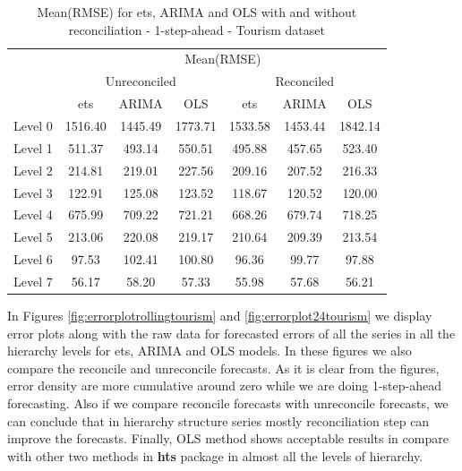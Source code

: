 \documentclass[11pt,a4paper,]{article}
\begin{document}
\begin{table}[t]

\caption{\label{tab:Tourismdataresulrolling}Mean(RMSE) for ets, ARIMA and OLS with and without reconciliation - 1-step-ahead - Tourism dataset}
\centering
\begin{tabular}{ccccccc}
\toprule
\multicolumn{1}{c}{} & \multicolumn{6}{c}{Mean(RMSE)} \\
\cmidrule(l{2pt}r{2pt}){2-7}
\multicolumn{1}{c}{} & \multicolumn{3}{c}{Unreconciled} & \multicolumn{3}{c}{Reconciled} \\
\cmidrule(l{2pt}r{2pt}){2-4} \cmidrule(l{2pt}r{2pt}){5-7}
 & ets & ARIMA & OLS & ets & ARIMA & OLS\\
\midrule
Level 0 & 1516.40 & 1445.49 & 1773.71 & 1533.58 & 1453.44 & 1842.14\\
Level 1 & 511.37 & 493.14 & 550.51 & 495.88 & 457.65 & 523.40\\
Level 2 & 214.81 & 219.01 & 227.56 & 209.16 & 207.52 & 216.33\\
Level 3 & 122.91 & 125.08 & 123.52 & 118.67 & 120.52 & 120.00\\
Level 4 & 675.99 & 709.22 & 721.21 & 668.26 & 679.74 & 718.25\\
Level 5 & 213.06 & 220.08 & 219.17 & 210.64 & 209.39 & 213.54\\
Level 6 & 97.53 & 102.41 & 100.80 & 96.36 & 99.77 & 97.88\\
Level 7 & 56.17 & 58.20 & 57.33 & 55.98 & 57.68 & 56.21\\
\bottomrule
\end{tabular}
\end{table}

In Figures \ref{fig:errorplotrollingtourism} and
\ref{fig:errorplot24tourism} we display error plots along with the raw
data for forecasted errors of all the series in all the hierarchy levels
for ets, ARIMA and OLS models. In these figures we also compare the
reconcile and unreconcile forecasts. As it is clear from the figures,
error density are more cumulative around zero while we are doing
1-step-ahead forecasting. Also if we compare reconcile forecasts with
unreconcile forecasts, we can conclude that in hierarchy structure
series mostly reconciliation step can improve the forecasts. Finally,
OLS method shows acceptable results in compare with other two methods in
\textbf{hts} package in almost all the levels of hierarchy.
\end{document}
